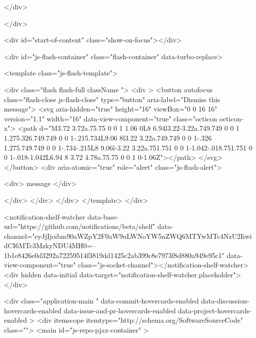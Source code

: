{{  
</div>
        
          
    </div>

  <div id="start-of-content" class="show-on-focus"></div>








    <div id="js-flash-container" class="flash-container" data-turbo-replace>




  <template class="js-flash-template">
    
<div class="flash flash-full   {{ className }}">
  <div >
    <button autofocus class="flash-close js-flash-close" type="button" aria-label="Dismiss this message">
      <svg aria-hidden="true" height="16" viewBox="0 0 16 16" version="1.1" width="16" data-view-component="true" class="octicon octicon-x">
    <path d="M3.72 3.72a.75.75 0 0 1 1.06 0L8 6.94l3.22-3.22a.749.749 0 0 1 1.275.326.749.749 0 0 1-.215.734L9.06 8l3.22 3.22a.749.749 0 0 1-.326 1.275.749.749 0 0 1-.734-.215L8 9.06l-3.22 3.22a.751.751 0 0 1-1.042-.018.751.751 0 0 1-.018-1.042L6.94 8 3.72 4.78a.75.75 0 0 1 0-1.06Z"></path>
</svg>
    </button>
    <div aria-atomic="true" role="alert" class="js-flash-alert">
      
      <div>{{ message }}</div>

    </div>
  </div>
</div>
  </template>
</div>


    
  <notification-shelf-watcher data-base-url="https://github.com/notifications/beta/shelf" data-channel="eyJjIjoibm90aWZpY2F0aW9uLWNoYW5nZWQ6MTYwMTc4NzU2IiwidCI6MTc3MzkyNDU4MH0=--1b1e8426e0d3292a72259514f3819dd1425c2ab399c8e7973f8d880a949e95c1" data-view-component="true" class="js-socket-channel"></notification-shelf-watcher>
  <div hidden data-initial data-target="notification-shelf-watcher.placeholder"></div>






  <div
    class="application-main "
    data-commit-hovercards-enabled
    data-discussion-hovercards-enabled
    data-issue-and-pr-hovercards-enabled
    data-project-hovercards-enabled
  >
        <div itemscope itemtype="http://schema.org/SoftwareSourceCode" class="">
    <main id="js-repo-pjax-container" >
      
      






}}
